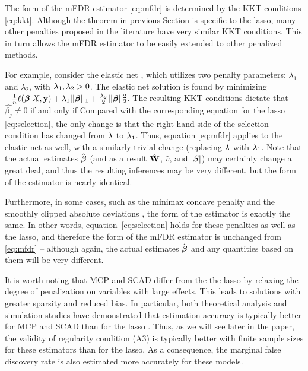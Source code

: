 The form of the mFDR estimator \eqref{eq:mfdr} is determined by the KKT conditions \eqref{eq:kkt}.  Although the theorem in previous Section is specific to the lasso, many other penalties proposed in the literature have very similar KKT conditions. This in turn allows the mFDR estimator to be easily extended to other penalized methods.

For example, consider the elastic net \citep{Elastic_Net}, which utilizes two penalty parameters: $\lambda_1$ and $\lambda_2$, with $\lambda_1, \lambda_2 >0$. The elastic net solution is found by minimizing $-\frac{1}{n} \ell(\boldsymbol{\beta}|X,\mathbf{y}) + \lambda_1 ||\boldsymbol{\beta}||_1 + \frac{\lambda_2}{2}||\boldsymbol{\beta}||_{2}^2 $. The resulting KKT conditions dictate that $\hat{\beta_j} \neq 0$ if and only if
Compared with the corresponding equation for the lasso \eqref{eq:selection}, the only change is that the right hand side of the selection condition has changed from $\lambda$ to $\lambda_1$.  Thus, equation \eqref{eq:mfdr} applies to the elastic net as well, with a similarly trivial change (replacing $\lambda$ with $\lambda_1$.  Note that the actual estimates $\hat{\boldsymbol{\beta}}$ (and as a result $\hat{\mathbf{W}}$, $\hat{v}$, and $\left\lvert S\right\rvert$) may certainly change a great deal, and thus the resulting inferences may be very different, but the form of the estimator is nearly identical.

Furthermore, in some cases, such as the minimax concave penalty \citep[MCP; ][]{MCP} and the smoothly clipped absolute deviations \citep[SCAD; ][]{SCAD}, the form of the estimator is exactly the same.  In other words, equation~\eqref{eq:selection} holds for these penalties as well as the lasso, and therefore the form of the mFDR estimator is unchanged from \eqref{eq:mfdr} -- although again, the actual estimates $\hat{\boldsymbol{\beta}}$ and any quantities based on them will be very different.

It is worth noting that MCP and SCAD differ from the the lasso by relaxing the degree of penalization on variables with large effects.  This leads to solutions with greater sparsity and reduced bias.  In particular, both theoretical analysis and simulation studies have demonstrated that estimation accuracy is typically better for MCP and SCAD than for the lasso \citep{MCP,SCAD,Breheny2011}.  Thus, as we will see later in the paper, the validity of regularity condition (A3) is typically better with finite sample sizes for these estimators than for the lasso.  As a consequence, the marginal false discovery rate is also estimated more accurately for these models.

